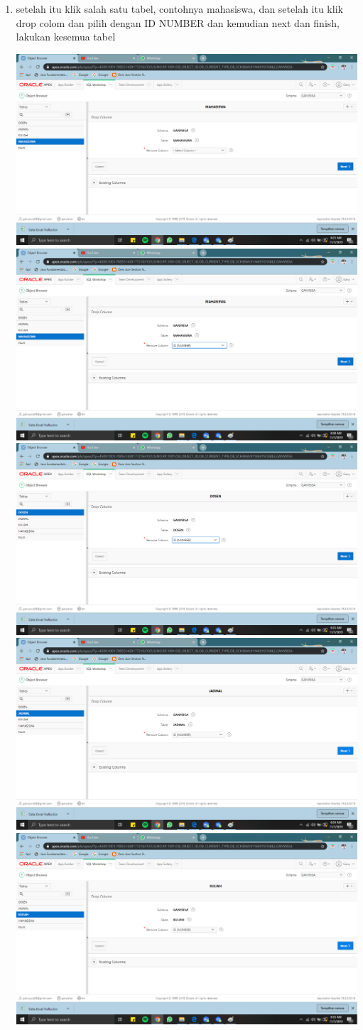 \documentclass{article}
\begin{document}
\begin{enumerate}
\begin{center}
    \end{center}
    \item setelah itu klik salah satu tabel, contohnya mahasiswa, dan setelah itu klik drop colom dan pilih dengan ID NUMBER dan kemudian next dan finish, lakukan kesemua tabel
    \begin{center}
    \includegraphics[width=.6\textwidth]{gambar/14.png}
    \includegraphics[width=.6\textwidth]{gambar/15.png}
    \includegraphics[width=.6\textwidth]{gambar/16.png}
    \includegraphics[width=.6\textwidth]{gambar/17.png}
    \includegraphics[width=.6\textwidth]{gambar/18.png}

\end{center}
\end{enumerate}
\end{document}
